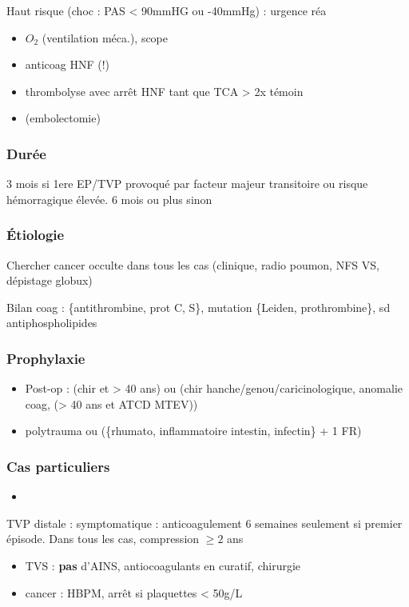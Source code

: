 \documentclass{book}
\begin{document}
Haut risque (choc : PAS < 90mmHG ou -40mmHg) : urgence \faBomb \thus réa

\begin{itemize}
\item \(O_2\) (ventilation méca.), scope
\item anticoag HNF (!)
\item thrombolyse avec arrêt HNF tant que TCA > 2x témoin
\item (embolectomie)
\end{itemize}


\subsubsection{Durée}
\label{sec:org5889fa9}
3 mois si 1ere EP/TVP provoqué par facteur majeur transitoire ou risque
hémorragique élevée. 6 mois ou plus sinon

\subsubsection{Étiologie}
\label{sec:org97f3073}
Chercher cancer occulte dans tous les cas (clinique, radio poumon, NFS VS,
dépistage globux)

Bilan coag : \{antithrombine, prot C, S\}, mutation \{Leiden, prothrombine\}, sd
antiphospholipides

\subsubsection{Prophylaxie}
\label{sec:org531580d}

\begin{itemize}
\item Post-op : (chir et > 40 ans) ou (chir hanche/genou/caricinologique, anomalie
coag, (> 40 ans et ATCD MTEV))
\item polytrauma ou (\{rhumato, inflammatoire intestin, infectin\} + 1 FR)
\end{itemize}



\subsubsection{Cas particuliers}
\label{sec:org4455bce}

\begin{itemize}
\item 
\end{itemize}
TVP distale : symptomatique : anticoagulement 6 semaines seulement si premier épisode. Dans tous les cas,
compression \(\ge 2\) ans
\begin{itemize}
\item \gls{TVS} : \textbf{pas} d'AINS, antiocoagulants en curatif, chirurgie
\item cancer : HBPM, arrêt si plaquettes < 50g/L
\end{itemize}
\end{document}
